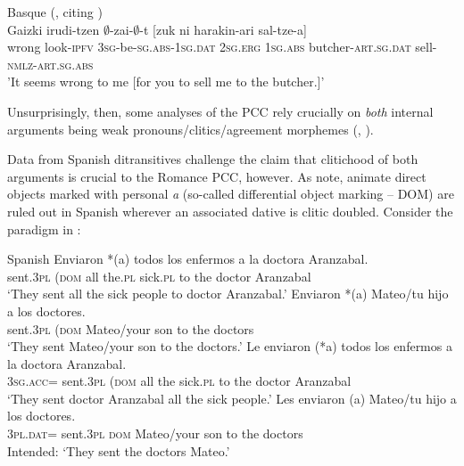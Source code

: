 \documentclass[output=paper,colorlinks,citecolor=brown,nonflat]{./langscibook}
\begin{document}
\ea%
    \label{ex:sheehan:10}
    Basque (\citealt[7]{Preminger2019}, citing \citealt[98]{Laka1996})\\
    \gll    Gaizki   irudi-tzen ${\emptyset}$-zai-${\emptyset}$-t         [zuk ni harakin-ari    sal-tze-a]\\
          wrong   look-\textsc{ipfv} \textsc{3sg}-be-\textsc{sg}.\textsc{abs}{}-\textsc{1sg}.\textsc{dat}  {\db}\textsc{2sg}.\textsc{erg}    \textsc{1sg}.\textsc{abs} butcher-\textsc{art.sg}.\textsc{dat} sell-\textsc{nmlz-art.sg.abs}\\
    \glt 'It seems wrong to me [for you to sell me to the butcher.]' %
\z

Unsurprisingly, then, some analyses of the PCC rely crucially on \textit{both} internal arguments being weak pronouns/clitics/agreement morphemes (\citealt{Bianchi2006}, \citealt{Stegovec2017}). 

Data from Spanish ditransitives challenge the claim that clitichood of both arguments is crucial to the Romance PCC, however. As \citet{OrmazabalRomero2013Borealis} note, animate direct objects marked with personal \textit{a} (so-called differential object marking – DOM) are ruled out in Spanish wherever an associated dative is clitic doubled. Consider the paradigm in :

\ea%
    \label{ex:sheehan:11}
    Spanish \citep[224]{OrmazabalRomero2013Borealis}
    \ea\label{ex:sheehan:11a}
    \gll   Enviaron   *(a)   todos los   enfermos a   la   doctora   Aranzabal.\\
        sent.\textsc{3pl}  (\textsc{dom}   all   the.\textsc{pl}   sick.\textsc{pl}  to   the   doctor   Aranzabal\\
    \glt ‘They sent all the sick people to doctor Aranzabal.’
    \ex\label{ex:sheehan:11b}
    \gll   Enviaron  *(a)   Mateo/tu   hijo   a   los   doctores.\\
         sent.\textsc{3pl}  (\textsc{dom}   Mateo/your   son   to   the   doctors\\
    \glt ‘They sent Mateo/your son to the doctors.’ 
    \ex\label{ex:sheehan:11c}
    \gll   Le   enviaron   (*a)  todos   los  enfermos   a  la  doctora   Aranzabal.\\
        \textsc{3sg.acc=} sent.\textsc{3pl}   (\textsc{dom}   all   the sick.\textsc{pl}   to   the doctor Aranzabal\\
    \glt ‘They sent doctor Aranzabal all the sick people.’
    \ex\label{ex:sheehan:11d}
    \gll    *Les   enviaron   (a)   Mateo/tu   hijo  a   los   doctores.\\
        \textsc{3pl.dat}=  sent.\textsc{3pl}   \textsc{dom}   Mateo/your   son   to   the   doctors\\
    \glt Intended: ‘They sent the doctors Mateo.’
    \z
\z
\end{document}
